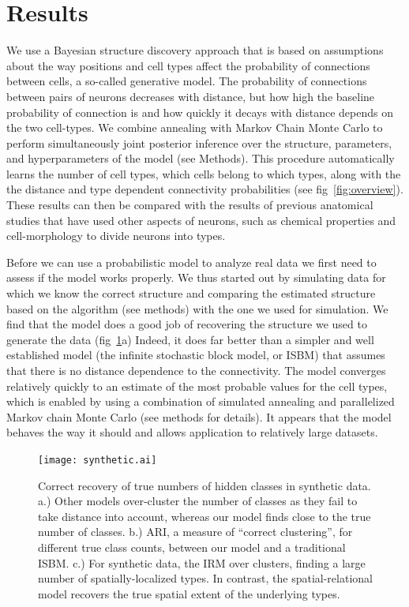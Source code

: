 \documentclass{article}
\begin{document}
\section{Results}
We use a Bayesian structure discovery approach that is based on
assumptions about the way positions and cell types affect the
probability of connections between cells, a so-called generative
model. The probability of connections between pairs of neurons
decreases with distance, but how high the baseline probability of
connection is and how quickly it decays with distance depends on the
two cell-types. We combine annealing with Markov Chain Monte Carlo to
perform simultaneously joint posterior inference over the structure,
parameters, and hyperparameters of the model (see Methods). This
procedure automatically learns the number of cell types, which cells 
belong to which types, along with the 
the distance and type dependent connectivity probabilities (see
fig~\ref{fig:overview}). These results can then be compared with the
results of previous anatomical studies that have used other aspects of
neurons, such as chemical properties and cell-morphology to divide
neurons into types.

Before we can use a probabilistic model to analyze real data we first
need to assess if the model works properly. We thus started out by
simulating data for which we know the correct structure and comparing
the estimated structure based on the algorithm (see methods) with the
one we used for simulation. We find that the model does a good job of
recovering the structure we used to generate the data
(fig~\ref{fig:synthetic}a) Indeed, it does far better than a simpler
and well established model (the infinite stochastic block model, or
ISBM) that assumes that there is no distance dependence to the
connectivity. The model converges relatively quickly to an estimate of
the most probable values for the cell types, which is enabled by using
a combination of simulated annealing and parallelized Markov chain
Monte Carlo (see methods for details). It appears that the model
behaves the way it should and allows application to relatively large
datasets.

\begin{figure}
  \centering 
  \centerline{\texttt{[image: synthetic.ai]}}
  \caption{Correct recovery of true numbers of hidden classes
in synthetic data. a.) Other models over-cluster the number
of classes as they fail to take distance into account, whereas
our model finds close to the true number of classes. b.) ARI, a measure
of ``correct clustering'', for
different true class counts, between our model and a traditional
ISBM. c.) For synthetic data, 
the IRM over clusters, finding a large number of spatially-localized types. 
In contrast, the spatial-relational model recovers the true spatial
extent of the underlying types.}
\label{fig:synthetic}
\end{figure}
\end{document}
